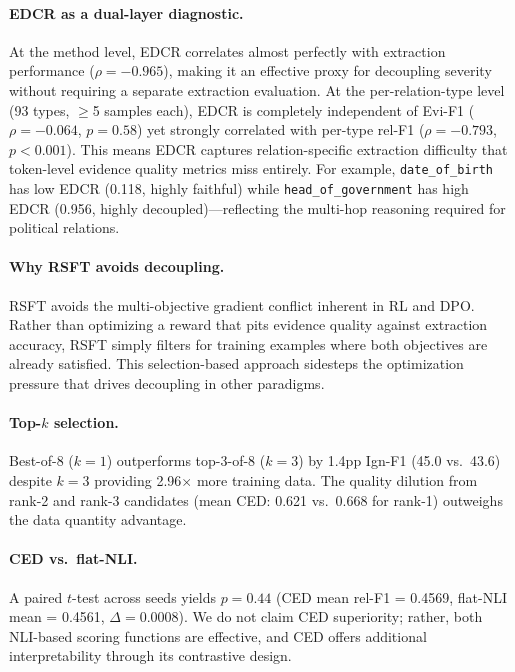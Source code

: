 \documentclass[11pt,a4paper]{article}
\begin{document}
\paragraph{EDCR as a dual-layer diagnostic.}
At the method level, EDCR correlates almost perfectly with extraction performance ($\rho = -0.965$), making it an effective proxy for decoupling severity without requiring a separate extraction evaluation.
At the per-relation-type level (93 types, $\geq$5 samples each), EDCR is completely independent of Evi-F1 ($\rho = -0.064$, $p = 0.58$) yet strongly correlated with per-type rel-F1 ($\rho = -0.793$, $p < 0.001$).
This means EDCR captures relation-specific extraction difficulty that token-level evidence quality metrics miss entirely.
For example, \texttt{date\_of\_birth} has low EDCR (0.118, highly faithful) while \texttt{head\_of\_government} has high EDCR (0.956, highly decoupled)---reflecting the multi-hop reasoning required for political relations.

\paragraph{Why RSFT avoids decoupling.}
RSFT avoids the multi-objective gradient conflict inherent in RL and DPO.
Rather than optimizing a reward that pits evidence quality against extraction accuracy, RSFT simply filters for training examples where both objectives are already satisfied.
This selection-based approach sidesteps the optimization pressure that drives decoupling in other paradigms.

\paragraph{Top-$k$ selection.}
Best-of-8 ($k=1$) outperforms top-3-of-8 ($k=3$) by 1.4pp Ign-F1 (45.0 vs.\ 43.6) despite $k=3$ providing 2.96$\times$ more training data.
The quality dilution from rank-2 and rank-3 candidates (mean CED: 0.621 vs.\ 0.668 for rank-1) outweighs the data quantity advantage.

\paragraph{CED vs.\ flat-NLI.}
A paired $t$-test across seeds yields $p = 0.44$ (CED mean rel-F1 = 0.4569, flat-NLI mean = 0.4561, $\Delta = 0.0008$).
We do not claim CED superiority; rather, both NLI-based scoring functions are effective, and CED offers additional interpretability through its contrastive design.
\end{document}
